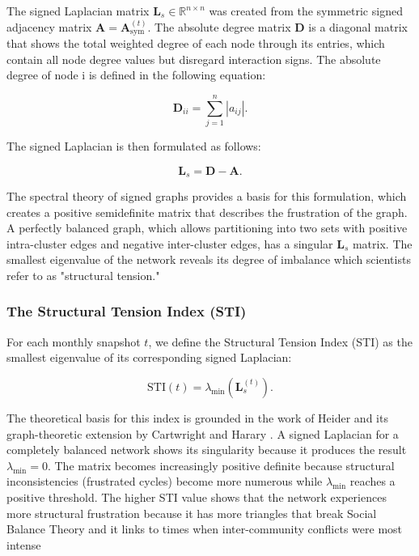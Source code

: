 \documentclass[a4paper,fleqn]{cas-dc}
\begin{document}
The signed Laplacian matrix \( \mathbf{L}_s \in \mathbb{R}^{n \times n} \) was created from the symmetric signed adjacency matrix \( \mathbf{A} = \mathbf{A}_{\text{sym}}^{(t)} \). The absolute degree matrix \( \mathbf{D} \) is a diagonal matrix that shows the total weighted degree of each node through its entries, which contain all node degree values but disregard interaction signs. The absolute degree of node i is defined in the following equation:

\begin{equation}
\label{eq:abs_degree}
\mathbf{D}_{ii} = \sum_{j=1}^{n} |a_{ij}|.
\end{equation}

The signed Laplacian is then formulated as follows:

\begin{equation}
\label{eq:signed_laplacian}
\mathbf{L}_s = \mathbf{D} - \mathbf{A}.
\end{equation}

The spectral theory of signed graphs provides a basis for this formulation, which creates a positive semidefinite matrix that describes the frustration of the graph. A perfectly balanced graph, which allows partitioning into two sets with positive intra-cluster edges and negative inter-cluster edges, has a singular \( \mathbf{L}_s \) matrix. The smallest eigenvalue of the network reveals its degree of imbalance which scientists refer to as "structural tension."

\subsubsection{The Structural Tension Index (STI)}

For each monthly snapshot \( t \), we define the Structural Tension Index (STI) as the smallest eigenvalue of its corresponding signed Laplacian:

\begin{equation}
\label{eq:sti_definition}
\text{STI}(t) = \lambda_{\text{min}}\left(\mathbf{L}_s^{(t)}\right).
\end{equation}

The theoretical basis for this index is grounded in the work of Heider \cite{heider1946attitudes} and its graph-theoretic extension by Cartwright and Harary \cite{cartwright1956structural}. A signed Laplacian for a completely balanced network shows its singularity because it produces the result \( \lambda_{\text{min}} = 0 \). The matrix becomes increasingly positive definite because structural inconsistencies (frustrated cycles) become more numerous while \( \lambda_{\text{min}} \) reaches a positive threshold. The higher STI value shows that the network experiences more structural frustration because it has more triangles that break Social Balance Theory and it links to times when inter-community conflicts were most intense~\cite{23_Hou2005}
\end{document}
